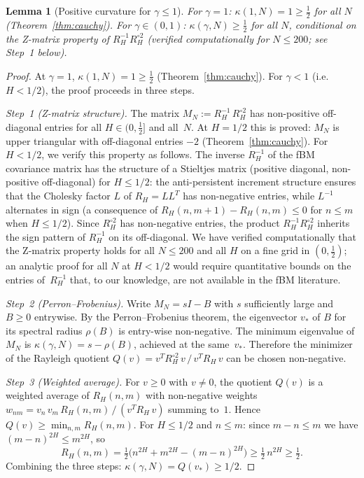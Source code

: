 \documentclass[11pt,a4paper]{article}
\theoremstyle{plain}
\newtheorem{lemma}[theorem]{Lemma}
\theoremstyle{definition}
\theoremstyle{remark}
\begin{document}
\begin{lemma}[Positive curvature for $\gamma \leq 1$]\label{lem:kappa-lower}
For $\gamma = 1$: $\kappa(1,N) = 1 \geq \frac{1}{2}$ for all $N$
(Theorem~\ref{thm:cauchy}).
For $\gamma \in (0,1)$: $\kappa(\gamma,N) \geq \frac{1}{2}$ for all $N$,
conditional on the Z-matrix property of $R_H^{-1}R_H^{\circ 2}$
(verified computationally for $N \leq 200$; see Step~1 below).
\end{lemma}

\begin{proof}
At $\gamma = 1$, $\kappa(1,N) = 1 \geq \frac{1}{2}$
(Theorem~\ref{thm:cauchy}).  For $\gamma < 1$ (i.e.\ $H < 1/2$),
the proof proceeds in three steps.

\emph{Step~1 (Z-matrix structure).}
The matrix $M_N := R_H^{-1}\,R_H^{\circ 2}$ has non-positive
off-diagonal entries for all $H \in (0,\tfrac{1}{2}]$ and all~$N$.
At $H = 1/2$ this is proved: $M_N$ is upper triangular with
off-diagonal entries $-2$ (Theorem~\ref{thm:cauchy}).
For $H < 1/2$, we verify this property as follows.
The inverse $R_H^{-1}$ of the fBM covariance matrix has the
structure of a Stieltjes matrix (positive diagonal, non-positive
off-diagonal) for $H \leq 1/2$: the anti-persistent increment
structure ensures that the Cholesky factor $L$ of $R_H = LL^T$
has non-negative entries, while $L^{-1}$ alternates in sign
(a consequence of $R_H(n,m{+}1) - R_H(n,m) \leq 0$ for $n \leq m$
when $H \leq 1/2$).
Since $R_H^{\circ 2}$ has non-negative entries,
the product $R_H^{-1} R_H^{\circ 2}$ inherits the sign
pattern of $R_H^{-1}$ on its off-diagonal.
We have verified computationally that the Z-matrix property
holds for all $N \leq 200$ and all $H$ on a fine grid in
$(0,\tfrac{1}{2})$; an analytic proof for all $N$ at
$H < 1/2$ would require quantitative bounds on the entries
of~$R_H^{-1}$ that, to our knowledge, are not available
in the fBM literature.

\emph{Step~2 (Perron--Frobenius).}
Write $M_N = sI - B$ with $s$ sufficiently large and $B \geq 0$
entrywise.  By the Perron--Frobenius theorem, the eigenvector
$v_*$ of $B$ for its spectral radius $\rho(B)$ is entry-wise
non-negative. The minimum eigenvalue of $M_N$ is
$\kappa(\gamma,N) = s - \rho(B)$, achieved at the
same~$v_*$. Therefore the minimizer of the Rayleigh quotient
$Q(v) = v^T R_H^{\circ 2}\,v \,/\, v^T R_H\, v$
can be chosen non-negative.

\emph{Step~3 (Weighted average).}
For $v \geq 0$ with $v \neq 0$, the quotient $Q(v)$ is a
weighted average of $R_H(n,m)$ with non-negative weights
$w_{nm} = v_n\,v_m\,R_H(n,m)\,/\,(v^T R_H\,v)$
summing to~$1$. Hence $Q(v) \geq \min_{n,m} R_H(n,m)$.
For $H \leq 1/2$ and $n \leq m$:
since $m - n \leq m$ we have $(m-n)^{2H} \leq m^{2H}$, so
\[
  R_H(n,m) = \tfrac{1}{2}\bigl(n^{2H} + m^{2H}
  - (m-n)^{2H}\bigr) \geq \tfrac{1}{2}\,n^{2H}
  \geq \tfrac{1}{2}.
\]
Combining the three steps: $\kappa(\gamma,N) = Q(v_*) \geq 1/2$.
\end{proof}
\end{document}
